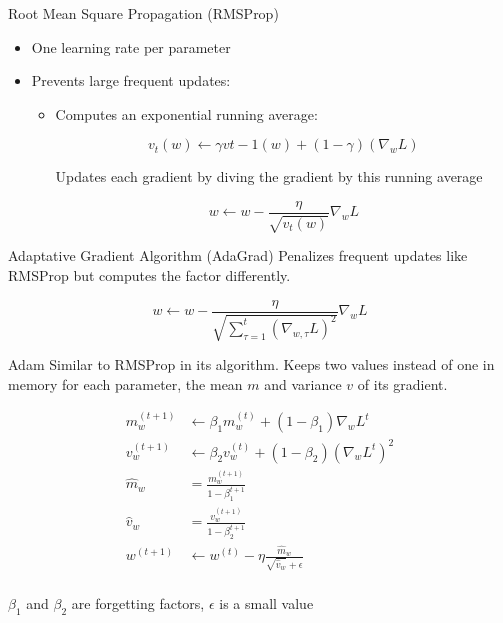 \begin{frame}{Root Mean Square Propagation (RMSProp)}
  \begin{itemize}
    \item One learning rate per parameter
    \item Prevents large frequent updates:
      \begin{itemize}
        \item Computes an exponential running average:

        \[v_t(w) \leftarrow \gamma v{t-1}(w) + (1 - \gamma)(\nabla_w L)\]

        Updates each gradient by diving the gradient by this running average

        \[w \leftarrow w - \frac{\eta}{\sqrt{v_t(w)}}\nabla_wL\]
      \end{itemize}
  \end{itemize}
\end{frame}

\begin{frame}{Adaptative Gradient Algorithm (AdaGrad)}
  Penalizes frequent updates like RMSProp but computes the factor differently.

  \[
    w \leftarrow w - \frac{\eta}{\sqrt{\sum_{\tau=1}^t(\nabla_{w,\tau} L)^2}}\nabla_{w} L
  \]
\end{frame}

\begin{frame}{Adam}
  Similar to RMSProp in its algorithm. Keeps two values instead of one in memory for each parameter, the mean $m$ and variance $v$ of its gradient.

  \begin{align*}
    m_w^{(t+1)} &\leftarrow \beta_1m_w^{(t)} + (1 - \beta_1)\nabla_wL^{t} \\
    v_w^{(t+1)} &\leftarrow \beta_2v_w^{(t)} + (1 - \beta_2)(\nabla_wL^{t})^2 \\
    \hat{m}_w &= \frac{m_w^{(t+1)}}{1 - \beta_1^{t+1}} \\
    \hat{v}_w &= \frac{v_w^{(t+1)}}{1 - \beta_2^{t+1}} \\
    w^{(t+1)} &\leftarrow w^{(t)} - \eta\frac{\hat{m}_w}{\sqrt{\hat{v}_w} + \epsilon} \\
  \end{align*}

  $\beta_1$ and $\beta_2$ are forgetting factors, $\epsilon$ is a small value
\end{frame}

